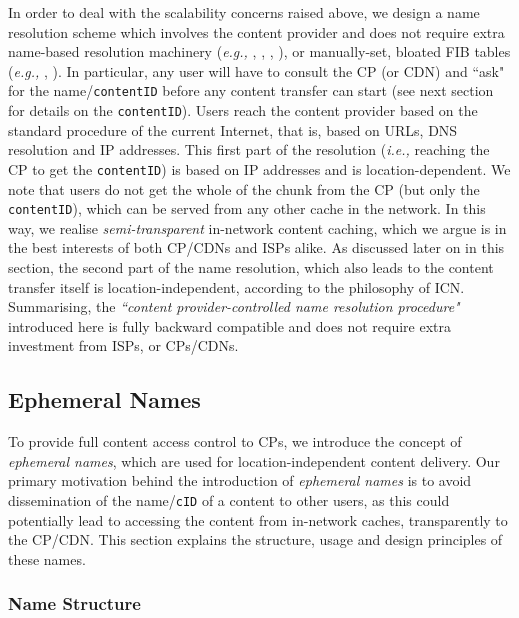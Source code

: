 \documentclass{sig-alternate}
\newcommand{\ie}{{\em i.e.,\/ }}
\newcommand{\eg}{{\em e.g.,\/ }}
\begin{document}
In order to deal with the scalability concerns raised above, we design a name resolution scheme which involves the content provider and does not require extra name-based resolution machinery (\eg \cite{curling}, \cite{tyson-juno}, \cite{netinf-comcom}, \cite{copss-mayutan}), or manually-set, bloated FIB tables (\eg \cite{ccn}, \cite{conet}). In particular, any user will have to consult the CP (or CDN) and ``ask" for the name/\texttt{contentID} before any content transfer can start (see next section for details on the \texttt{contentID}).
Users reach the content provider based on the standard procedure of the current Internet, that is, based on URLs, DNS resolution and IP addresses. This first part of the resolution (\ie reaching the CP to get the \texttt{contentID}) is based on IP addresses and is location-dependent. We note that users do not get the whole of the chunk from the CP (but only the \texttt{contentID}), which can be served from any other cache in the network. In this way, we realise \textit{semi-transparent} in-network content caching, which we argue is in the best interests of both CP/CDNs and ISPs alike. As discussed later on in this section, the second part of the name resolution, which also leads to the content transfer itself is location-independent, according to the philosophy of ICN. Summarising, the \textit{``content provider-controlled name resolution procedure"} introduced here is fully backward compatible and does not require extra investment from ISPs, or CPs/CDNs.








\subsection{Ephemeral Names}\label{cc:en}

To provide full content access control to CPs, we introduce the concept of \textit{ephemeral names}, which are used for location-independent content delivery. Our primary motivation behind the introduction of \textit{ephemeral names} is to avoid dissemination of the name/\texttt{cID} of a content to other users, as this could potentially lead to accessing the content from in-network caches, transparently to the CP/CDN.
This section explains the structure, usage and design principles of these names.

\subsubsection{Name Structure}
\end{document}
